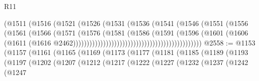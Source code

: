 \begin{lexlean}{R11}
\begin{coremodule}
                                                      (@1511
                                                        (@1516
                                                          (@1521
                                                            (@1526
                                                              (@1531
                                                                (@1536
                                                                  (@1541
                                                                    (@1546
                                                                      (@1551
                                                                        (@1556
                                                                          (@1561
                                                                            (@1566
                                                                              (@1571
                                                                                (@1576
                                                                                  (@1581
                                                                                    (@1586
                                                                                      (@1591
                                                                                        (@1596
                                                                                          (@1601
                                                                                            (@1606
                                                                                              (@1611
                                                                                                (@1616
                                                                                                  @2462)))))))))))))))))))))))))))))))))))))))))))))))
@2558 := @1153
    (@1157
      (@1161
        (@1165
          (@1169
            (@1173
              (@1177
                (@1181
                  (@1185
                    (@1189
                      (@1193
                        (@1197
                          (@1202
                            (@1207
                              (@1212
                                (@1217
                                  (@1222
                                    (@1227
                                      (@1232
                                        (@1237
                                          (@1242
                                            (@1247

\end{coremodule}
\end{lexlean}
